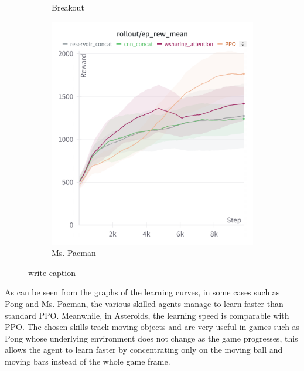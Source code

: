 \begin{figure}[htbp]
\begin{subfigure}[b]{0.32\textwidth}
        \caption{Breakout}
        \label{fig:asteroidstrain}
    \end{subfigure}
    \hfill
    \begin{subfigure}[b]{0.32\textwidth}
        \centering
        \includegraphics[width=\textwidth]{images/mspacman_train.png}
        \caption{Ms. Pacman}
        \label{fig:mspacmantrain}
    \end{subfigure}

    \caption{write caption}
    \label{fig:trainresults}
\end{figure}


As can be seen from the graphs of the learning curves, in some cases such as Pong and Ms. Pacman, the various skilled agents manage to learn faster than standard PPO. Meanwhile, in Asteroids, the learning speed is comparable with PPO.
The chosen skills track moving objects and are very useful in games such as Pong whose underlying environment does not change as the game progresses, this allows the agent to learn faster by concentrating only on the moving ball and moving bars instead of the whole game frame.

